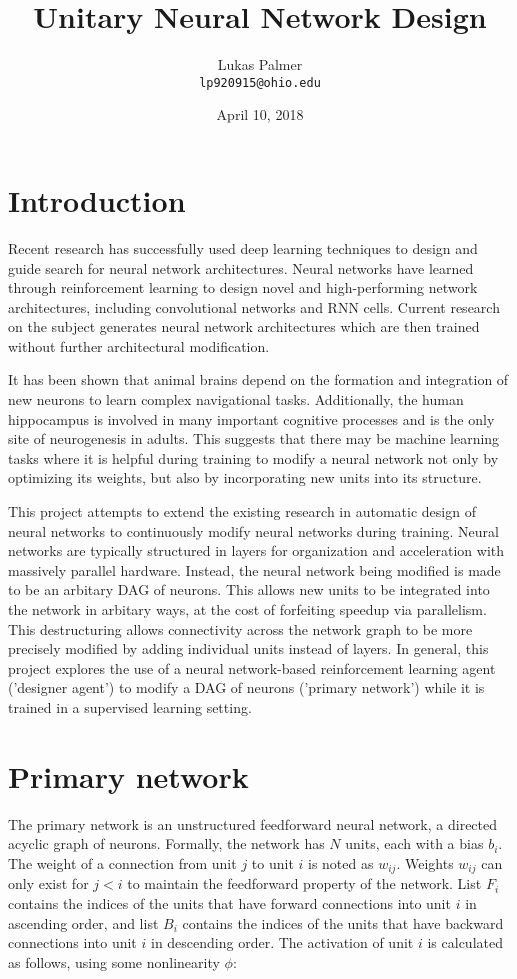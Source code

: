 \documentclass{article}[12px]
\title{Unitary Neural Network Design}
\author{Lukas Palmer \\ \texttt{lp920915@ohio.edu}}
\date{April 10, 2018}
\begin{document}
\maketitle

\section{Introduction}

Recent research has successfully used deep learning techniques to design and guide search for neural network architectures. Neural networks have learned through reinforcement learning to design novel and high-performing network architectures, including convolutional networks and RNN cells\cite{DBLP:journals/corr/ZophL16}. Current research on the subject generates neural network architectures which are then trained without further architectural modification.

It has been shown that animal brains depend on the formation and integration of new neurons to learn complex navigational tasks\cite{Dupret08}. Additionally, the human hippocampus is involved in many important cognitive processes and is the only site of neurogenesis in adults. This suggests that there may be machine learning tasks where it is helpful during training to modify a neural network not only by optimizing its weights, but also by incorporating new units into its structure.

This project attempts to extend the existing research in automatic design of neural networks to continuously modify neural networks during training. Neural networks are typically structured in layers for organization and acceleration with massively parallel hardware. Instead, the neural network being modified is made to be an arbitary DAG of neurons. This allows new units to be integrated into the network in arbitary ways, at the cost of forfeiting speedup via parallelism. This destructuring allows connectivity across the network graph to be more precisely modified by adding individual units instead of layers. In general, this project explores the use of a neural network-based reinforcement learning agent ('designer agent') to modify a DAG of neurons ('primary network') while it is trained in a supervised learning setting.

\section{Primary network} \label{primary}

The primary network is an unstructured feedforward neural network, a directed acyclic graph of neurons. Formally, the network has \(N\) units, each with a bias \(b_i\). The weight of a connection from unit \(j\) to unit \(i\) is noted as \(w_{ij}\). Weights \(w_{ij}\) can only exist for \(j < i\) to maintain the feedforward property of the network. List \(F_i\) contains the indices of the units that have forward connections into unit \(i\) in ascending order, and list \(B_i\) contains the indices of the units that have backward connections into unit \(i\) in descending order. The activation of unit \(i\) is calculated as follows, using some nonlinearity \(\phi\):
\end{document}
